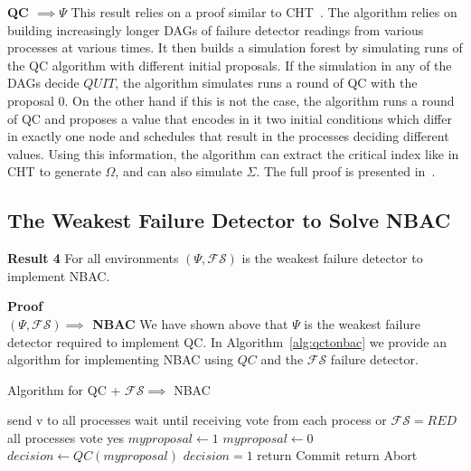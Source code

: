 \textbf{QC $\implies \Psi$} This result relies on a proof similar to CHT~\cite{chandra1996weakest}. The algorithm relies
on building increasingly longer DAGs of failure detector readings from various processes at various times. It then
builds a simulation forest by simulating runs of the QC algorithm with different initial proposals. If the simulation in
any of the DAGs decide $QUIT$, the algorithm simulates runs a round of QC with the proposal $0$. On the other hand if
this is not the case, the algorithm runs a round of QC and proposes a value that encodes in it two initial conditions
which differ in exactly one node and schedules that result in the processes deciding different values. Using this
information, the algorithm can extract the critical index like in CHT to generate $\Omega$, and can also simulate
$\Sigma$. The full proof is presented in~\cite{guerraoui2002weakest}.

\subsection{The Weakest Failure Detector to Solve NBAC}
\textbf{Result 4} For all environments $(\Psi, \mathcal{FS})$ is the weakest failure detector to implement NBAC. 

\textbf{Proof}\\
\textbf{$(\Psi, \mathcal{FS}) \implies$ NBAC} We have shown above that $\Psi$ is the weakest failure detector required
to implement QC. In Algorithm~\ref{alg:qctonbac} we provide an algorithm for implementing NBAC using $QC$ and the
$\mathcal{FS}$ failure detector.

\begin{algorithm}
\caption{Algorithm for QC + $\mathcal{FS} \implies$ NBAC}
\label{alg:qctonbac}
\begin{algorithmic}[1]
    \State send v to all processes
    \State wait until receiving vote from each process or $\mathcal{FS} = RED$
    \If all processes vote yes
        \State $myproposal \gets 1$
    \Else {}
        \State $myproposal \gets 0$
    \EndIf
    \State $decision \gets QC(myproposal)$
    \If $decision = 1$
        \State return Commit
    \Else {}
        \State return Abort
    \EndIf
\EndProcedure
\end{algorithmic}
\end{algorithm}

